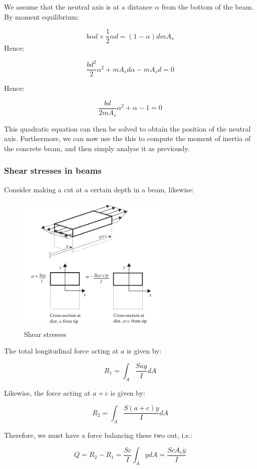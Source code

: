 \documentclass{article}
\begin{document}
We assume that the neutral axis is at a distance $\alpha$ from the bottom of the beam. By moment equilibrium:

\[ b\alpha d \times \frac{1}{2}\alpha d = (1 - \alpha)d mA_s \]
Hence:

\[ \frac{bd^2}{2}\alpha^2 + mA_s d \alpha - mA_sd = 0 \]

Hence:

\[ \frac{bd}{2mA_s}\alpha^2 + \alpha - 1 = 0 \]

This quadratic equation can then be solved to obtain the position of the neutral axis. Furthermore, we can now use the this to compute the moment of inertia of the concrete beam, and then simply analyse it as previously.

\subsubsection{Shear stresses in beams}

Consider making a cut at a certain depth in a beam, likewise:

\begin{figure}[h]
    \centering
    \includegraphics[width = 0.65\textwidth]{images/shear.png}
    \caption{Shear stresses}
    \label{fig:enter-label}
\end{figure}

The total longitudinal force acting at $a$ is given by:

\[ R_1 = \int_A \frac{Say}{I}dA \]

Likewise, the force acting at $a + c$ is given by:

\[ R_2 = \int_A \frac{S(a+c)y}{I}dA \]

Therefore, we must have a force balancing these two out, i.e.:

\[ Q = R_2 - R_1 = \frac{Sc}{I}\int_A ydA = \frac{ScA_c\overline{y}}{I} \]
\end{document}
